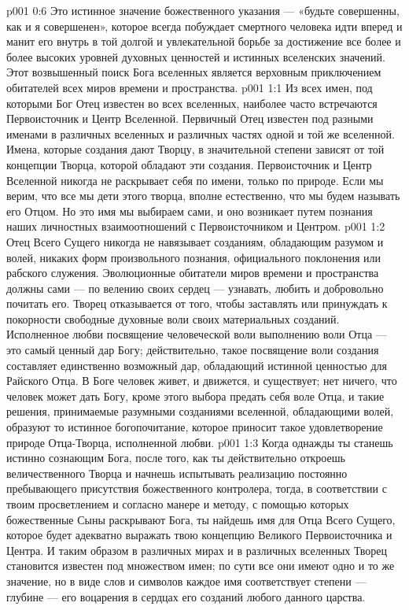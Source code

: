 \vs p001 0:6 Это истинное значение божественного указания --- «будьте совершенны, как и я совершенен», которое всегда побуждает смертного человека идти вперед и манит его внутрь в той долгой и увлекательной борьбе за достижение все более и более высоких уровней духовных ценностей и истинных вселенских значений. Этот возвышенный поиск Бога вселенных является верховным приключением обитателей всех миров времени и пространства.
\vs p001 1:1 Из всех имен, под которыми Бог Отец известен во всех вселенных, наиболее часто встречаются Первоисточник и Центр Вселенной. Первичный Отец известен под разными именами в различных вселенных и различных частях одной и той же вселенной. Имена, которые создания дают Творцу, в значительной степени зависят от той концепции Творца, которой обладают эти создания. Первоисточник и Центр Вселенной никогда не раскрывает себя по имени, только по природе. Если мы верим, что все мы дети этого творца, вполне естественно, что мы будем называть его Отцом. Но это имя мы выбираем сами, и оно возникает путем познания наших личностных взаимоотношений с Первоисточником и Центром.
\vs p001 1:2 Отец Всего Сущего никогда не навязывает созданиям, обладающим разумом и волей, никаких форм произвольного познания, официального поклонения или рабского служения. Эволюционные обитатели миров времени и пространства должны сами --- по велению своих сердец --- узнавать, любить и добровольно почитать его. Творец отказывается от того, чтобы заставлять или принуждать к покорности свободные духовные воли своих материальных созданий. Исполненное любви посвящение человеческой воли выполнению воли Отца --- это самый ценный дар Богу; действительно, такое посвящение воли создания составляет единственно возможный дар, обладающий истинной ценностью для Райского Отца. В Боге человек живет, и движется, и существует; нет ничего, что человек может дать Богу, кроме этого выбора предать себя воле Отца, и такие решения, принимаемые разумными созданиями вселенной, обладающими волей, образуют то истинное богопочитание, которое приносит такое удовлетворение природе Отца\hyp{}Творца, исполненной любви.
\vs p001 1:3 Когда однажды ты станешь истинно сознающим Бога, после того, как ты действительно откроешь величественного Творца и начнешь испытывать реализацию постоянно пребывающего присутствия божественного контролера, тогда, в соответствии с твоим просветлением и согласно манере и методу, с помощью которых божественные Сыны раскрывают Бога, ты найдешь имя для Отца Всего Сущего, которое будет адекватно выражать твою концепцию Великого Первоисточника и Центра. И таким образом в различных мирах и в различных вселенных Творец становится известен под множеством имен; по сути все они имеют одно и то же значение, но в виде слов и символов каждое имя соответствует степени --- глубине --- его воцарения в сердцах его созданий любого данного царства.
